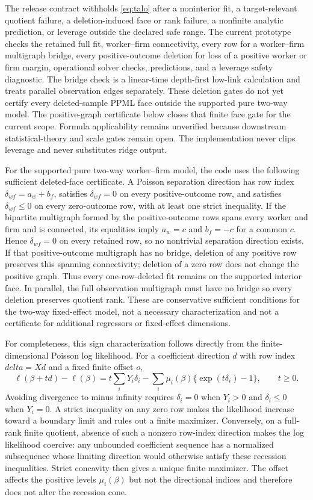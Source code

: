 \documentclass[11pt]{article}
\begin{document}
The release contract withholds \eqref{eq:talo} after a noninterior fit, a
target-relevant quotient failure, a deletion-induced face or rank failure, a
nonfinite analytic prediction, or leverage outside the declared safe range.
The current prototype checks the retained full fit, worker--firm connectivity,
every row for a worker--firm multigraph bridge, every positive-outcome deletion
for loss of a positive worker or firm margin, operational solver checks,
predictions, and a leverage safety diagnostic.  The bridge check is a
linear-time depth-first low-link calculation and treats parallel observation
edges separately.  These deletion gates do not yet certify every
deleted-sample PPML face outside the supported pure two-way model.  The
positive-graph certificate below closes that finite face gate for the current
scope.  Formula applicability remains unverified because downstream
statistical-theory and scale gates remain open.  The implementation never clips
leverage and never substitutes ridge output.

For the supported pure two-way worker--firm model, the code uses the following
sufficient deleted-face certificate.  A Poisson separation direction has row
index $\delta_{wf}=a_w+b_f$, satisfies $\delta_{wf}=0$ on every
positive-outcome row, and satisfies $\delta_{wf}\leq0$ on every zero-outcome
row, with at least one strict inequality.  If the bipartite multigraph formed
by the positive-outcome rows spans every worker and firm and is connected, its
equalities imply $a_w=c$ and $b_f=-c$ for a common $c$.  Hence
$\delta_{wf}=0$ on every retained row, so no nontrivial separation direction
exists.  If that positive-outcome multigraph has no bridge, deletion of any
positive row preserves this spanning connectivity; deletion of a zero row
does not change the positive graph.  Thus every one-row-deleted fit remains on
the supported interior face.  In parallel, the full observation multigraph
must have no bridge so every deletion preserves quotient rank.  These are
conservative sufficient conditions for the two-way fixed-effect model, not a
necessary characterization and not a certificate for additional regressors or
fixed-effect dimensions.

For completeness, this sign characterization follows directly from the
finite-dimensional Poisson log likelihood.  For a coefficient direction $d$
with row index $delta=Xd$ and a fixed finite offset $o$,
\[
 \ell(\beta+td)-\ell(\beta)
 =t\sum_iY_i\delta_i-
   \sum_i\mu_i(\beta)\{\exp(t\delta_i)-1\},\qquad t\geq0.
\]
Avoiding divergence to minus infinity requires $\delta_i=0$ when $Y_i>0$
and $\delta_i\leq0$ when $Y_i=0$.  A strict inequality on any zero row makes
the likelihood increase toward a boundary limit and rules out a finite
maximizer.  Conversely, on a full-rank finite quotient, absence of such a
nonzero row-index direction makes the log likelihood coercive: any unbounded
coefficient sequence has a normalized subsequence whose limiting direction
would otherwise satisfy these recession inequalities.  Strict concavity then
gives a unique finite maximizer.  The offset affects the positive levels
$\mu_i(\beta)$ but not the directional indices and therefore does not alter
the recession cone.
\end{document}
